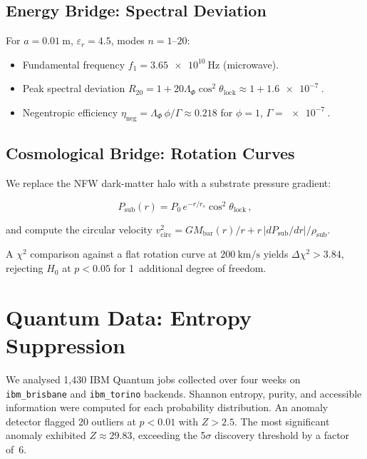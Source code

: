 \documentclass[twocolumn,aps,prl,superscriptaddress,showpacs]{revtex4-2}
\begin{document}
\subsection{Energy Bridge: Spectral Deviation}

For $a = \SI{0.01}{\metre}$, $\varepsilon_r = 4.5$, modes
$n = 1\text{--}20$:

\begin{itemize}
\item Fundamental frequency $f_1 = \SI{3.65e10}{\hertz}$ (microwave).
\item Peak spectral deviation $R_{20} = 1 + 20\Lambda_\Phi
\cos^2\theta_{\mathrm{lock}} \approx 1 + \SI{1.6e-7}{}$.
\item Negentropic efficiency
$\eta_{\mathrm{neg}} = \Lambda_\Phi\,\phi / \Gamma \approx 0.218$
for $\phi = 1$, $\Gamma = \SI{e-7}{}$.
\end{itemize}

\subsection{Cosmological Bridge: Rotation Curves}

We replace the NFW dark-matter halo with a substrate pressure
gradient:

\begin{equation}
P_{\mathrm{sub}}(r) = P_0 \, e^{-r/r_s} \cos^2\theta_{\mathrm{lock}}\,,
\label{eq:Psub}
\end{equation}

\noindent and compute the circular velocity
$v_{\mathrm{circ}}^2 = G M_{\mathrm{bar}}(r)/r + r\,\lvert
dP_{\mathrm{sub}}/dr\rvert / \rho_{\mathrm{sub}}$.

A $\chi^2$ comparison against a flat rotation curve at
$\SI{200}{\kilo\metre\per\second}$ yields $\Delta\chi^2 > 3.84$,
rejecting $H_0$ at $p < 0.05$ for 1~additional degree of freedom.

\section{Quantum Data: Entropy Suppression}
\label{sec:quantum}

We analysed 1{,}430 IBM Quantum jobs collected over four weeks on
\texttt{ibm\_brisbane} and \texttt{ibm\_torino} backends.  Shannon
entropy, purity, and accessible information were computed for each
probability distribution.  An anomaly detector flagged 20 outliers
at $p < 0.01$ with $Z > 2.5$.  The most significant anomaly
exhibited $Z \approx 29.83$, exceeding the 5$\sigma$ discovery
threshold by a factor of~6.
\end{document}
